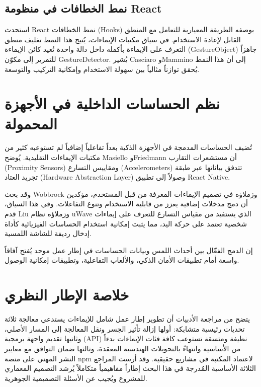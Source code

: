 \begin{Arabic}
\subsection{نمط الخطافات في منظومة React}

استحدث \textenglish{React} نمط الخطافات (\textenglish{Hooks}) بوصفه الطريقة المعيارية للتعامل مع المنطق القابل لإعادة الاستخدام. في سياق مكتبات الإيماءات، يُتيح هذا النمط تغليف منطق التعرف على الإيماءة بأكمله داخل دالة واحدة تُعيد كائن الإيماءة (\textenglish{GestureObject}) جاهزاً للتمرير إلى مكوّن \textenglish{GestureDetector}. يُشير \textenglish{Casciaro} و\textenglish{Mammino} \cite{casciaro2020} إلى أن هذا النمط يُحقق توازناً مثالياً بين سهولة الاستخدام وإمكانية التركيب والتوسعة.

\section{نظم الحساسات الداخلية في الأجهزة المحمولة}

تُضيف الحساسات المدمجة في الأجهزة الذكية بعداً تفاعلياً إضافياً لم تستوعبه كثير من مكتبات الإيماءات التقليدية. يُوضح \textenglish{Masiello} و\textenglish{Friedmann} \cite{masiello2017} أن مستشعرات التقارب (\textenglish{Proximity Sensors}) ومقاييس التسارع (\textenglish{Accelerometers}) تتدفق بياناتها عبر طبقة تجريد العتاد (\textenglish{Hardware Abstraction Layer}) وصولاً إلى تطبيق \textenglish{React Native}. 

وقد بحث \textenglish{Wobbrock} وزملاؤه \cite{wobbrock2009} في تصميم الإيماءات المعرفة من قبل المستخدم، مؤكدين أن دمج مدخلات إضافية يعزز من قابلية الاستخدام وتنوع التفاعلات. وفي هذا السياق، قدم \textenglish{Liu} وزملاؤه \cite{liu2019} نظام \textenglish{uWave} الذي يستفيد من مقياس التسارع للتعرف على إيماءات شخصية تعتمد على حركة اليد، مما يثبت إمكانية استخدام الحساسات الفيزيائية كأداة إدخال رديفة للشاشة اللمسية.

إن الدمج الفعّال بين أحداث اللمس وبيانات الحساسات في إطار عمل موحد يُفتح آفاقاً واسعة أمام تطبيقات الأمان الذكي، والألعاب التفاعلية، وتطبيقات إمكانية الوصول.

\section{خلاصة الإطار النظري}

يتضح من مراجعة الأدبيات أن تطوير إطار عمل شامل للإيماءات يستدعي معالجة ثلاثة تحديات رئيسية متشابكة: أولها إزالة تأثير الجسر ونقل المعالجة إلى المسار الأصلي، وثانيها تقديم واجهة برمجية (\textenglish{API}) نظيفة ومتسقة تستوعب كافة فئات الإيماءات بدءاً من الأساسية وانتهاءً بالتحويلات الهندسية المعقدة، وثالثها ضمان التوافق مع معايير النشر المهني على منصة \textenglish{npm} لاعتماد المكتبة في مشاريع حقيقية. وقد أرست المراجع الثلاثة الأساسية المُدرجة في هذا البحث إطاراً مفاهيمياً متكاملاً يُرشد التصميم المعماري للمشروع ويُجيب عن الأسئلة التصميمية الجوهرية.

\end{Arabic}
